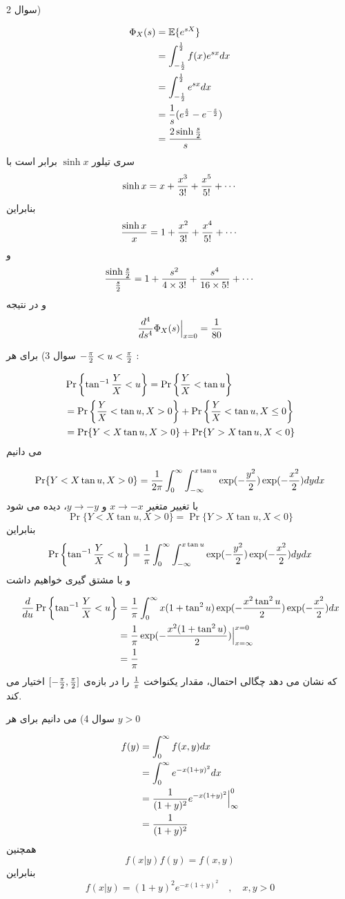 \documentclass[10pt,letterpaper]{report}
\newcommand{\EX}{\mathbb{E}}
\newcommand{\eqn}[1]{
\[\begin{split}
#1
\end{split}\]
}
\begin{document}
سوال 2) 
\eqn{
\Phi_X(s)&=\EX\{e^{sX}\}
\\&=\int_{-{1\over 2}}^{{1\over 2}} f(x)e^{sx}dx
\\&=\int_{-{1\over 2}}^{{1\over 2}} e^{sx}dx
\\&={1\over s}(e^{s\over 2}-e^{-{s\over 2}})
\\&={2\sinh {s\over 2}\over s}
}{}
سری تیلور $\sinh x$ برابر است با
$$
\sinh x=x+{x^3\over 3!}+{x^5\over 5!}+\cdots 
$$
بنابراین
$$
{\sinh x\over x}=1+{x^2\over 3!}+{x^4\over 5!}+\cdots 
$$
و
$$
{\sinh {s\over 2}\over {s\over 2}}=1+{s^2\over 4\times 3!}+{s^4\over16\times  5!}+\cdots 
$$
و در نتیجه
$$
{d^4\over ds^4}\Phi_X(s)\Big|_{x=0}={1\over 80}
$$

سوال 3) برای هر 
$
-{\pi\over 2}<u<{\pi\over 2}
$
:
\eqn{
&\Pr\left\{\tan^{-1}{Y\over X}<u\right\}=
\Pr\left\{{Y\over X}<\tan u\right\}
\\&=\Pr\left\{{Y\over X}<\tan u,X>0\right\}+\Pr\left\{{Y\over X}<\tan u,X\le0\right\}
\\&=\Pr\{Y<X\tan u,X>0\}+\Pr\{Y>X\tan u,X<0\}
}{}
می دانیم
\eqn{
\Pr\{Y<X\tan u,X>0\}={1\over 2\pi}\int_0^\infty\int_{-\infty}^{x\tan u} \exp(-{y^2\over 2}) \exp(-{x^2\over 2}) dydx
}{}
با تغییر متغیر $x\to -x$ و $y\to -y$، دیده می شود
$$
\Pr\{Y<X\tan u,X>0\}=\Pr\{Y>X\tan u,X<0\}
$$
بنابراین
$$
\Pr\left\{\tan^{-1}{Y\over X}<u\right\}={1\over \pi}\int_0^\infty\int_{-\infty}^{x\tan u} \exp(-{y^2\over 2}) \exp(-{x^2\over 2}) dydx
$$
و با مشتق گیری خواهیم داشت
\eqn{
{d\over du}\Pr\left\{\tan^{-1}{Y\over X}<u\right\}&={1\over \pi}\int_0^\infty x(1+\tan^2 u)\exp(-{x^2\tan^2 u\over 2}) \exp(-{x^2\over 2}) dx
\\&={1\over \pi}\exp(-{x^2(1+\tan^2 u)\over 2})\Big|_{x=\infty}^{x=0}
\\&={1\over \pi}
}{}
که نشان می دهد چگالی احتمال، مقدار یکنواخت $1\over \pi$ را در بازه‌ی 
$
[-{\pi\over 2},{\pi\over 2}]
$
 اختیار می کند.

سوال 4) می دانیم برای هر $y>0$
\eqn{
f(y)&=\int_{0}^{\infty} f(x,y)dx
\\&=\int_{0}^{\infty} e^{-x(1+y)^2}dx
\\&={1\over (1+y)^2}e^{-x(1+y)^2}\Big|^{0}_{\infty}
\\&={1\over (1+y)^2}
}{}
همچنین
$$
f(x|y)f(y)=f(x,y)
$$
بنابراین
$$
f(x|y)=(1+y)^2e^{-x(1+y)^2}\quad,\quad x,y>0
$$
\end{document}
